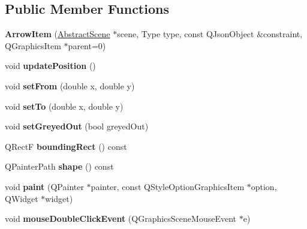 \subsection*{Public Member Functions}
\begin{DoxyCompactItemize}
\item 
\hypertarget{class_arrow_item_a1e129913f9a70bf8518fc5493a539e0f}{{\bfseries Arrow\-Item} (\hyperlink{class_abstract_scene}{Abstract\-Scene} $\ast$scene, Type type, const Q\-Json\-Object \&constraint, Q\-Graphics\-Item $\ast$parent=0)}\label{class_arrow_item_a1e129913f9a70bf8518fc5493a539e0f}

\item 
\hypertarget{class_arrow_item_a66e4169eef489bd0e65bc4e8c0a6571b}{void {\bfseries update\-Position} ()}\label{class_arrow_item_a66e4169eef489bd0e65bc4e8c0a6571b}

\item 
\hypertarget{class_arrow_item_a855b92d19eb0aef6c7972201fb68507d}{void {\bfseries set\-From} (double x, double y)}\label{class_arrow_item_a855b92d19eb0aef6c7972201fb68507d}

\item 
\hypertarget{class_arrow_item_a47e34fc1c436edae7733aed3014bce75}{void {\bfseries set\-To} (double x, double y)}\label{class_arrow_item_a47e34fc1c436edae7733aed3014bce75}

\item 
\hypertarget{class_arrow_item_a2655015ff870e40e8ca1bab2071f2948}{void {\bfseries set\-Greyed\-Out} (bool greyed\-Out)}\label{class_arrow_item_a2655015ff870e40e8ca1bab2071f2948}

\item 
\hypertarget{class_arrow_item_a3ae28a5b1783572849d1c8bd4b4ef706}{Q\-Rect\-F {\bfseries bounding\-Rect} () const }\label{class_arrow_item_a3ae28a5b1783572849d1c8bd4b4ef706}

\item 
\hypertarget{class_arrow_item_ad5d0141181c156cef86bc2929c1aa54f}{Q\-Painter\-Path {\bfseries shape} () const }\label{class_arrow_item_ad5d0141181c156cef86bc2929c1aa54f}

\item 
\hypertarget{class_arrow_item_a4e18ce132492c2672bf89cd3a791836a}{void {\bfseries paint} (Q\-Painter $\ast$painter, const Q\-Style\-Option\-Graphics\-Item $\ast$option, Q\-Widget $\ast$widget)}\label{class_arrow_item_a4e18ce132492c2672bf89cd3a791836a}

\item 
\hypertarget{class_arrow_item_ae842bb902038cb875bcc8019c5140dda}{void {\bfseries mouse\-Double\-Click\-Event} (Q\-Graphics\-Scene\-Mouse\-Event $\ast$e)}\label{class_arrow_item_ae842bb902038cb875bcc8019c5140dda}


\end{DoxyCompactItemize}
